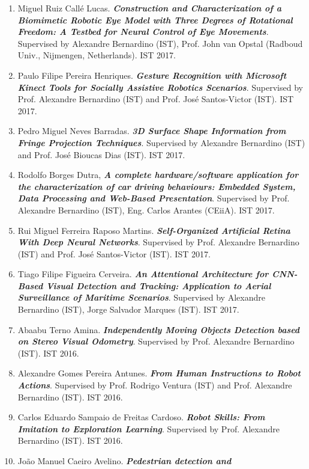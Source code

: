 \documentclass[
]{article}
\begin{document}
\begin{enumerate}
\item
  Miguel Ruiz Callé Lucas. \emph{\textbf{Construction and
  Characterization of a Biomimetic Robotic Eye Model with Three Degrees
  of Rotational Freedom: A Testbed for Neural Control of Eye
  Movements}}. Supervised by Alexandre Bernardino (IST), Prof. John van
  Opstal (Radboud Univ., Nijmengen, Netherlands). IST 2017.
\item
  Paulo Filipe Pereira Henriques. \emph{\textbf{Gesture Recognition with
  Microsoft Kinect Tools for Socially Assistive Robotics Scenarios}}.
  Supervised by Prof. Alexandre Bernardino (IST) and Prof. José
  Santos-Victor (IST). IST 2017.
\item
  Pedro Miguel Neves Barradas. \emph{\textbf{3D Surface Shape
  Information from Fringe Projection Techniques}}. Supervised by
  Alexandre Bernardino (IST) and Prof. José Bioucas Dias (IST). IST
  2017.
\item
  Rodolfo Borges Dutra, \emph{\textbf{A complete hardware/software
  application for the characterization of car driving behaviours:
  Embedded System, Data Processing and Web-Based Presentation}}.
  Supervised by Prof. Alexandre Bernardino (IST), Eng. Carlos Arantes
  (CEiiA). IST 2017.
\item
  Rui Miguel Ferreira Raposo Martins. \emph{\textbf{Self-Organized
  Artificial Retina With Deep Neural Networks}}. Supervised by Prof.
  Alexandre Bernardino (IST) and Prof. José Santos-Victor (IST). IST
  2017.
\item
  Tiago Filipe Figueira Cerveira. \emph{\textbf{An Attentional
  Architecture for CNN-Based Visual Detection and Tracking: Application
  to Aerial Surveillance of Maritime Scenarios}}. Supervised by
  Alexandre Bernardino (IST), Jorge Salvador Marques (IST). IST 2017.
\item
  Abaabu Terno Amina. \emph{\textbf{Independently Moving Objects
  Detection based on Stereo Visual Odometry}}. Supervised by Prof.
  Alexandre Bernardino (IST). IST 2016.
\item
  Alexandre Gomes Pereira Antunes. \emph{\textbf{From Human Instructions
  to Robot Actions}}. Supervised by Prof. Rodrigo Ventura (IST) and
  Prof. Alexandre Bernardino (IST). IST 2016.
\item
  Carlos Eduardo Sampaio de Freitas Cardoso. \emph{\textbf{Robot Skills:
  From Imitation to Exploration Learning}}. Supervised by Prof.
  Alexandre Bernardino (IST). IST 2016.
\item
  João Manuel Caeiro Avelino. \emph{\textbf{Pedestrian detection and
}}
\end{enumerate}
\end{document}
